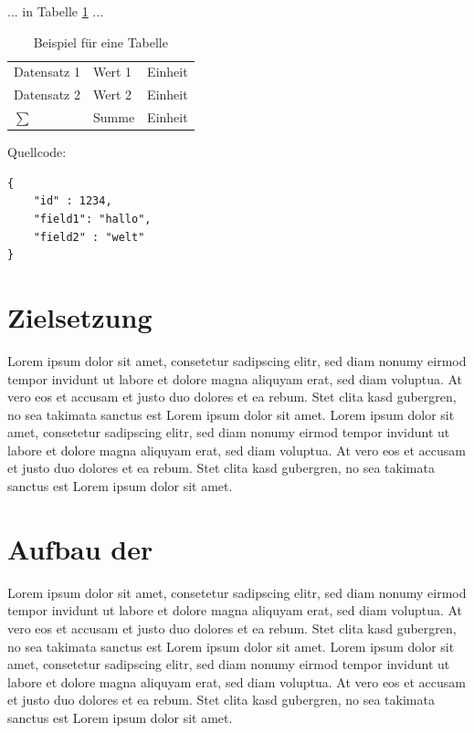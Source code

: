 ... in Tabelle \ref{tbl_example_table} ...

\begin{table}[!h]
    \centering
    \begin{tabular}{l|ll}
        Datensatz 1     & Wert 1    & Einheit \\
        Datensatz 2     & Wert 2    & Einheit \\ \hline
        $\sum$          & Summe     & Einheit \\
    \end{tabular}
    \caption{Beispiel für eine Tabelle}
    \label{tbl_example_table}
\end{table}

Quellcode:

\begin{verbatim}
{   
    "id" : 1234,  
    "field1": "hallo",  
    "field2" : "welt"
}
\end{verbatim}


\section{Zielsetzung}
Lorem ipsum dolor sit amet, consetetur sadipscing elitr, sed diam nonumy eirmod tempor invidunt ut labore et dolore magna aliquyam erat, sed diam voluptua. At vero eos et accusam et justo duo dolores et ea rebum. Stet clita kasd gubergren, no sea takimata sanctus est Lorem ipsum dolor sit amet. Lorem ipsum dolor sit amet, consetetur sadipscing elitr, sed diam nonumy eirmod tempor invidunt ut labore et dolore magna aliquyam erat, sed diam voluptua. At vero eos et accusam et justo duo dolores et ea rebum. Stet clita kasd gubergren, no sea takimata sanctus est Lorem ipsum dolor sit amet. \cite{Nobody07}

\section{Aufbau der \myworktype}
Lorem ipsum dolor sit amet, consetetur sadipscing elitr, sed diam nonumy eirmod tempor invidunt ut labore et dolore magna aliquyam erat, sed diam voluptua. At vero eos et accusam et justo duo dolores et ea rebum. Stet clita kasd gubergren, no sea takimata sanctus est Lorem ipsum dolor sit amet. Lorem ipsum dolor sit amet, consetetur sadipscing elitr, sed diam nonumy eirmod tempor invidunt ut labore et dolore magna aliquyam erat, sed diam voluptua. At vero eos et accusam et justo duo dolores et ea rebum. Stet clita kasd gubergren, no sea takimata sanctus est Lorem ipsum dolor sit amet. \cite{Nobody06}
